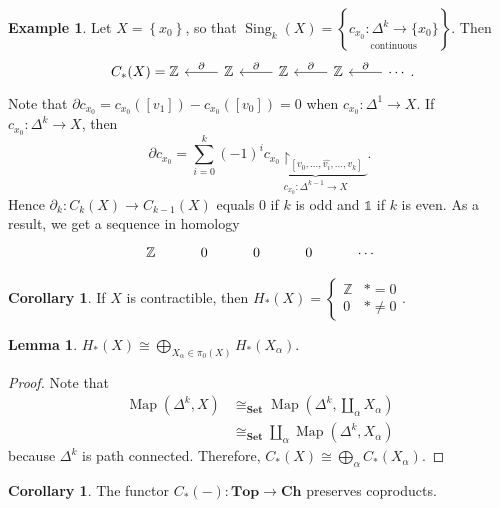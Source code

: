 \documentclass[10pt,letterpaper,cm]{nupset}
\theoremstyle{definition}
\newtheorem{exmp}[definition]{Example}
\theoremstyle{theorem}
\newtheorem{lemma}[definition]{Lemma}
\newtheorem{corollary}[definition]{Corollary}
\theoremstyle{remark}
\newcommand{\Z}{\mathbb Z}
\newcommand{\1}{\mathbb{1}}
\newcommand{\0}{\vec 0}
\DeclareMathOperator{\map}{Map}
\DeclareMathOperator{\sing}{Sing}
\begin{document}
\begin{exmp}
Let $X =\left\{x_0\right\}$, so that $\sing_k(X) = \left\{\underset{\text{continuous}}{c_{x_0} : \Delta^k \to \{x_0\}}\right\}$. Then
\[
\begin{tikzcd}
C_{\ast}(X) =  \Z & \Z \arrow[l, "\partial"'] & \Z \arrow[l, "\partial"'] & \Z \arrow[l, "\partial"'] & \cdots \arrow[l, "\partial"']
\end{tikzcd}.
\]  Note that $\partial{c_{x_0}} = c_{x_0}([v_1]) - c_{x_0}([v_0]) =0$ when $c_{x_0} : \Delta^1 \to X$. If $c_{x_0} : \Delta^k \to X$, then $$\partial{c_{x_0}} = \sum_{i=0}^k ({-1})^i \underbrace{c_{x_0}\restriction_{[v_0, \ldots, \hat{v_i}, \ldots, v_k]}}_{c_{x_0} : \Delta^{k-1} \to X}.$$ Hence $\partial_k : C_k(X) \to C_{k-1}(X)$ equals $0$ if $k$ is odd and $\1$ if $k$ is even. As a result, we get a sequence in homology 
\[
\begin{tikzcd}
\Z & 0 & 0 & 0 & \cdots
\end{tikzcd}
\]
\end{exmp}

\begin{corollary}
If $X$ is contractible, then $H_{\ast}(X) = \begin{cases} \Z & \ast =0 \\ 0 & \ast \ne 0 \end{cases}.$
\end{corollary}

\begin{lemma}
$H_{\ast}(X) \cong \bigoplus_{X_{\alpha} \in \pi_0(X)} H_{\ast}(X_{\alpha})$. 
\end{lemma}
\begin{proof} Note that
\begin{align*}
\map(\Delta^k, X) & \cong_{\mathbf{Set}} \map(\Delta^k, \coprod_{\alpha} X_{\alpha})
\\ & \cong_{\mathbf{Set}} \coprod_{\alpha} \map(\Delta^k, X_{\alpha})
\end{align*}
because $\Delta^k$ is path connected. Therefore, $C_{\ast}(X) \cong \bigoplus_{\alpha} C_{\ast}(X_{\alpha})$.
\end{proof}

\begin{corollary}
The functor $C_{\ast}(-) : \mathbf{Top} \to \mathbf{Ch}$ preserves coproducts. 
\end{corollary}
\end{document}
